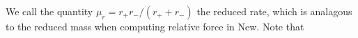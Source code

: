 We call the quantity \(\mu_r = r_+r_-/(r_+ + r_-)\) the reduced rate, which is analagous to the reduced mass when computing relative force in New.  Note that